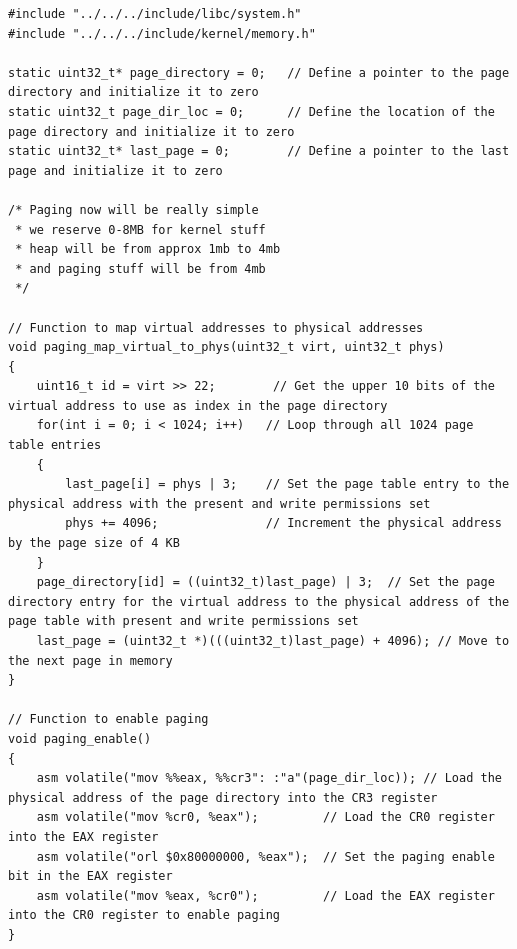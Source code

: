 \documentclass[../main.tex]{subfiles}
\begin{document}
\label{lst:memory_c}
\begin{verbatim}
#include "../../../include/libc/system.h"
#include "../../../include/kernel/memory.h"

static uint32_t* page_directory = 0;   // Define a pointer to the page directory and initialize it to zero
static uint32_t page_dir_loc = 0;      // Define the location of the page directory and initialize it to zero
static uint32_t* last_page = 0;        // Define a pointer to the last page and initialize it to zero

/* Paging now will be really simple
 * we reserve 0-8MB for kernel stuff
 * heap will be from approx 1mb to 4mb
 * and paging stuff will be from 4mb
 */

// Function to map virtual addresses to physical addresses
void paging_map_virtual_to_phys(uint32_t virt, uint32_t phys)
{
    uint16_t id = virt >> 22;        // Get the upper 10 bits of the virtual address to use as index in the page directory
    for(int i = 0; i < 1024; i++)   // Loop through all 1024 page table entries
    {
        last_page[i] = phys | 3;    // Set the page table entry to the physical address with the present and write permissions set
        phys += 4096;               // Increment the physical address by the page size of 4 KB
    }
    page_directory[id] = ((uint32_t)last_page) | 3;  // Set the page directory entry for the virtual address to the physical address of the page table with present and write permissions set
    last_page = (uint32_t *)(((uint32_t)last_page) + 4096); // Move to the next page in memory
}

// Function to enable paging
void paging_enable()
{
    asm volatile("mov %%eax, %%cr3": :"a"(page_dir_loc)); // Load the physical address of the page directory into the CR3 register
    asm volatile("mov %cr0, %eax");         // Load the CR0 register into the EAX register
    asm volatile("orl $0x80000000, %eax");  // Set the paging enable bit in the EAX register
    asm volatile("mov %eax, %cr0");         // Load the EAX register into the CR0 register to enable paging
}


\end{verbatim}
\end{document}
